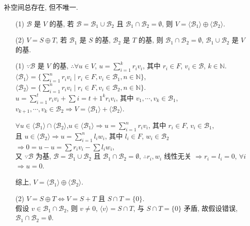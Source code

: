 \documentclass{note}
\begin{document}
补空间总存在, 但不唯一.

\begin{thm}[(课本定理 1.13)]
    \begin{itemize}
        \item[(1)] $\mathcal{B}$ 是 $V$ 的基, 若 $\mathcal{B}=\mathcal{B}_1\cup\mathcal{B}_2$ 且 $\mathcal{B}_1\cap\mathcal{B}_2=\emptyset$, 则 $V=\langle\mathcal{B}_1\rangle\oplus\langle\mathcal{B}_2\rangle$.
        \item[(2)] $V=S\oplus T$, 若 $\mathcal{B}_1$ 是 $S$ 的基, $\mathcal{B}_2$ 是 $T$ 的基, 则 $\mathcal{B}_1\cap\mathcal{B}_2=\emptyset$, $\mathcal{B}_1\cup\mathcal{B}_2$ 是 $V$ 的基.
    \end{itemize}
\end{thm}
\begin{pf}
    \begin{itemize}
        \item[(1)] $\because\mathcal{B}$ 是 $V$ 的基, $\therefore\forall u\in V$, $u=\sum_{i=1}^kr_iv_i$, 其中 $r_i\in F$, $v_i\in\mathcal{B}$, $k\in\mathbb{N}$.\\
        $\langle\mathcal{B}_1\rangle=\{\sum_{i=1}^nr_iv_i\mid r_i\in F,v_i\in\mathcal{B}_1,n\in\mathbb{N}\}$, $\langle\mathcal{B}_2\rangle=\{\sum_{i=1}^nr_iv_i\mid r_i\in F,v_i\in\mathcal{B}_2,n\in\mathbb{N}\}$.\\
        $u=\sum_{i=1}^tr_iv_i+\sum{i=t+1}^kr_iv_i$, 其中 $v_1,\cdots,v_k\in\mathcal{B}_1$, $v_{k+1},\cdots,v_k\in\mathcal{B}_2\Longrightarrow V=\langle\mathcal{B}_1\rangle+\langle\mathcal{B}_2\rangle$.

        $\forall u\in\langle\mathcal{B}_1\rangle\cap\langle\mathcal{B}_2\rangle$,$u\in\langle\mathcal{B}_1\rangle\Longrightarrow u=\sum_{i=1}^nr_iv_i$, 其中 $r_i\in F$, $v_i\in\mathcal{B}_1$,\\
        且 $u\in\langle\mathcal{B}_2\rangle\Longrightarrow u=\sum_{i=1}^nl_iw_i$, 其中 $l_i\in F$, $w_i\in\mathcal{B}_2$\\
        $\Longrightarrow 0=u-u=\sum r_iv_i-\sum l_iw_i$,\\
        又 $\because\mathcal{B}$ 为基, $\mathcal{B}=\mathcal{B}_1\cup\mathcal{B}_2$ 且 $\mathcal{B}_1\cap\mathcal{B}_2=\emptyset$, $\therefore r_i,w_i$ 线性无关 $\Longrightarrow r_i=l_i=0$, $\forall i$\\
        $\Longrightarrow u=0$.

        综上, $V=\langle\mathcal{B}_1\rangle\oplus\langle\mathcal{B}_2\rangle$.
        \item[(2)] $V=S\oplus T\Longleftrightarrow V=S+T$ 且 $S\cap T=\{0\}$.\\
        假设 $v\in\mathcal{B}_1\cap\mathcal{B}_2$, 则 $v\neq 0$, $\langle v\rangle=S\cap T$, 与 $S\cap T=\{0\}$ 矛盾, 故假设错误, $\mathcal{B}_1\cap\mathcal{B}_2=\emptyset$.


\end{itemize}
\end{pf}
\end{document}
